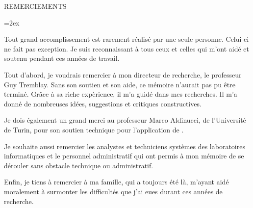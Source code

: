 
   \parskip=0pt
   \vspace*{0.1 truecm} 
   \begin{center}
    {\uppercase { REMERCIEMENTS }}\par
   \end{center}
   \nobreak \vspace*{1.10 truecm}
   \parskip=2ex



Tout grand accomplissement est rarement r\'ealis\'e par une seule personne. Celui-ci ne fait pas exception. Je suis reconnaissant \`a tous ceux et celles qui m'ont aid\'e et soutenu pendant ces ann\'ees de travail.

Tout d'abord, je voudrais remercier \`a mon directeur de recherche, le professeur Guy Tremblay. Sans son soutien et son aide, ce m\'emoire n'aurait pas pu \^etre termin\'e. Gr\^ace \`a sa riche exp\`erience, il m'a guid\'e dans mes recherches. Il m'a donn\'e de nombreuses id\'ees, suggestions et critiques constructives.

Je dois \'egalement un grand merci au professeur Marco Aldinucci, de l'Universit\'e de Turin, pour son soutien technique pour l'application de . 

Je souhaite aussi remercier les analystes et techniciens syst\`emes des laboratoires informatiques et le personnel administratif qui ont permis \`a mon m\'emoire de se d\'erouler sans obstacle technique ou administratif.

Enfin, je tiens \`a remercier \`a ma famille, qui a toujours \'et\'e l\`a, m'ayant aid\'e moralement \`a surmonter les difficult\'es que j'ai eues durant ces ann\'ees de recherche. 


